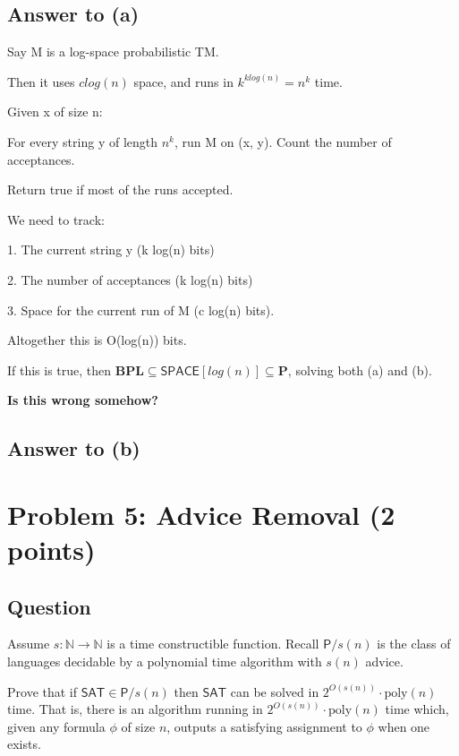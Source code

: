 \documentclass{article}
\renewcommand{\P}{\mathbf{P}}
\def \N {{\mathbb N}}
\def \BPL{{\mathbf{BPL}}}
\def \poly{\text{poly}}
\begin{document}
\subsection*{Answer to (a)}

Say M is a log-space probabilistic TM.

Then it uses $c log(n)$ space, and runs in $k^{k log(n)} = n^k$
time.

Given x of size n:

For every string y of length $n^k$, run M on (x, y).
Count the number of acceptances.

Return true if most of the runs accepted.

We need to track:

1. The current string y (k log(n) bits)

2. The number of acceptances (k log(n) bits)

3. Space for the current run of M (c log(n) bits).

Altogether this is O(log(n)) bits.

If this is true, then $\BPL \subseteq \textsf{SPACE}[log(n)] \subseteq \P$, solving both (a) and (b).

\textbf{Is this wrong somehow?}








\subsection*{Answer to (b)}



\newpage
\section*{Problem 5: Advice Removal (2 points)}

\subsection*{Question}
Assume $s : \N \rightarrow \N$ is a time constructible function. Recall $\mathsf{P}/s(n)$ is the class of languages decidable by a polynomial time algorithm with $s(n)$ advice. 

Prove that if $\textsf{SAT} \in \mathsf{P}/s(n)$ then $\textsf{SAT}$ can be solved in $2^{O(s(n))}\cdot \poly(n)$ time. That is, there is an algorithm running in $2^{O(s(n))}\cdot \poly(n)$ time which, given any formula $\phi$ of size $n$, outputs a satisfying assignment to $\phi$ when one exists.
\end{document}
